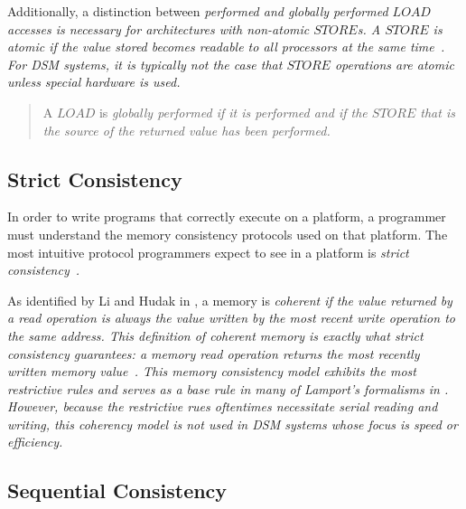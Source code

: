 Additionally, a distinction between \em performed \em and \em globally performed \em $LOAD$ accesses is necessary for architectures with non-atomic $STORE$s.  A $STORE$ is atomic if the value stored becomes readable to all processors at the same time~\cite{Gharachorloo:1990:MCE:325164.325102}.  For DSM systems, it is typically not the case that $STORE$ operations are atomic unless special hardware is used.

\begin{quote}
\begin{definition}
A $LOAD$ is \em globally performed \em if it is performed \em and \em if the $STORE$ that is the source of the returned value has been performed.
\end{definition}
\end{quote}

\subsection{Strict Consistency}
In order to write programs that correctly execute on a platform, a programmer must understand the memory consistency protocols used on that platform.  The most intuitive protocol programmers expect to see in a platform is \em strict consistency\em~\cite{Goodman:1989:53705}.

As identified by Li and Hudak in \cite{Li:1989:MCS:75104.75105}, a memory is \em coherent \em if the value returned by a read operation is always the value written by the most recent write operation to the same address.  This definition of \em coherent \em memory is exactly what \em strict consistency \em guarantees: a memory read operation returns the most recently written memory value~\cite{Nitzberg:1991:DSM:112827.112855}.  This memory consistency model exhibits the most restrictive rules and serves as a base rule in many of Lamport's formalisms in \cite{Lamport:1979:MMC:1311099.1311750}.  However, because the restrictive rues oftentimes necessitate serial reading and writing, this coherency model is not used in DSM systems whose focus is speed or efficiency.

\subsection{Sequential Consistency}

